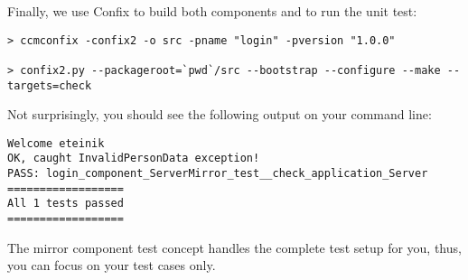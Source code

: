 \vspace{3mm}
Finally, we use Confix to build both components and to run the unit test:
\begin{footnotesize}
\begin{verbatim}
> ccmconfix -confix2 -o src -pname "login" -pversion "1.0.0"

> confix2.py --packageroot=`pwd`/src --bootstrap --configure --make --targets=check
\end{verbatim}
\end{footnotesize}
Not surprisingly, you should see the following output on your command line:
\begin{footnotesize}
\begin{verbatim}
Welcome eteinik
OK, caught InvalidPersonData exception!
PASS: login_component_ServerMirror_test__check_application_Server
==================
All 1 tests passed
==================
\end{verbatim}
\end{footnotesize}

The mirror component test concept handles the complete test setup for you, thus,
you can focus on your test cases only.

\newpage

